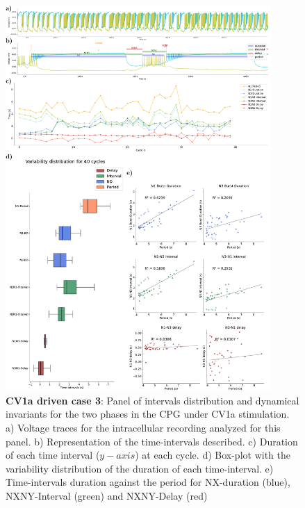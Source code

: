 \begin{figure}[htbp]
	\centering
	\includegraphics[width=0.9\textwidth]{./img/invariants/data/SUSSEX/CV1a_driven4/images/2phases/panel_with_intervals.pdf}
	\caption{\textbf{CV1a driven case 3}: Panel of intervals distribution and dynamical invariants for the two phases in the CPG under CV1a stimulation. a) Voltage traces for the intracellular recording analyzed for this panel. b) Representation of the time-intervals described. c) Duration of each time interval ($y-axis$) at each cycle. d) Box-plot with the variability distribution of the duration of each time-interval. e) Time-intervals duration against the period for NX-duration (blue), NXNY-Interval (green) and NXNY-Delay (red)}
	\label{fig:cv1a 4 2phases}
\end{figure}




